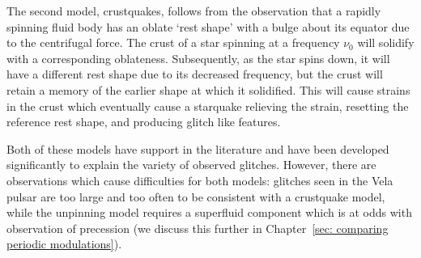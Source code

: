 The second model, crustquakes, follows from the observation that a rapidly
spinning fluid body has an oblate `rest shape' with a bulge about its equator
due to the centrifugal force. The crust of a star spinning at a frequency $\nu_0$
will solidify with a corresponding oblateness. Subsequently, as the star spins down,
it will have a different rest shape due to its decreased frequency, but the crust
will retain a memory of the earlier shape at which it solidified. This will cause
strains in the crust which eventually cause a starquake relieving the strain,
resetting the reference rest shape, and producing glitch like features.

Both of these models have support in the literature and have been developed
significantly to explain the variety of observed glitches. However, there are
observations which cause difficulties for both models: glitches seen in the
Vela pulsar are too large and too often to be consistent with a crustquake
model, while the unpinning model requires a superfluid component which is at
odds with observation of precession (we discuss this further in
Chapter~\ref{sec: comparing periodic modulations}).


